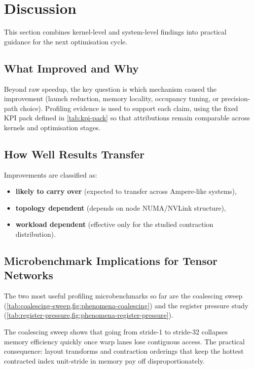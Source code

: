 \section{Discussion}\label{sec:discussion}

This section combines kernel-level and system-level findings into practical
guidance for the next optimisation cycle.

\subsection{What Improved and Why}

Beyond raw speedup, the key question is which mechanism caused the improvement
(launch reduction, memory locality, occupancy tuning, or precision-path
choice). Profiling evidence is used to support each claim,
using the fixed KPI pack defined in \cref{tab:kpi-pack} so that attributions
remain comparable across kernels and optimisation stages.

\subsection{How Well Results Transfer}

Improvements are classified as:

\begin{itemize}
  \item \textbf{likely to carry over} (expected to transfer across Ampere-like systems),
  \item \textbf{topology dependent} (depends on node NUMA/NVLink structure),
  \item \textbf{workload dependent} (effective only for the studied contraction
    distribution).
\end{itemize}

\subsection{Microbenchmark Implications for Tensor Networks}

The two most useful profiling microbenchmarks so far are the coalescing sweep
(\cref{tab:coalescing-sweep,fig:phenomena-coalescing}) and the register
pressure study (\cref{tab:register-pressure,fig:phenomena-register-pressure}).

The coalescing sweep shows that going from stride-1 to stride-32 collapses
memory efficiency quickly once warp lanes lose contiguous access. The
practical consequence: layout transforms and contraction orderings that keep
the hottest contracted index unit-stride in memory pay off disproportionately.

